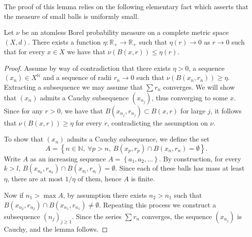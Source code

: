 \documentclass[AHL,Unicode,longabstracts]{cedram}
\newcommand{\nn}{\mathbb{N}}
\newcommand{\R}{{\mathbb R}}
\newcommand{\cv}{\rightarrow}
\newcommand{\set}[1]{\left\{#1\right\}}
\let\oldforall\forall
\renewcommand*{\forall}{\mathrel{\oldforall}}
\begin{document}
The proof of this lemma relies on the following elementary fact which asserts that the measure of small balls is uniformly small.

\begin{lemm}\label{lem:uniform}
Let $\nu$ be an atomless Borel probability measure on a complete metric space $(X,d)$. There exists a function $\eta : \R_+ \to \R_+$ such that $\eta(r)\to 0$ as $r\to 0$ such that for every $x\in X$ we have that $\nu(B(x,r))\leq \eta(r)$.
\end{lemm}

\goodbreak
\begin{proof}
Assume by way of contradiction that there exists $\eta>0$, a sequence $(x_n)\in X^\nn$ and a sequence of radii $r_n\cv 0$ such that $\nu(B(x_n, r_n))\geq \eta$. Extracting a subsequence we may assume that $\sum r_n$ converges. We will show that $(x_n)$ admits a Cauchy subsequence $(x_{n_j})$, thus converging to some $x$. Since for any $r>0$, we have that $B(x_{n_j}, r_{n_j}) \subset B(x, r)$ for large $j$, it follows that $\nu (B(x,r))\geq \eta$ for every $r$, contradicting the assumption on $\nu$.

To show that $(x_n)$ admits a Cauchy subsequence, we define the set
\[
A = \set{n\in \nn,\ \forall p>n, \ B(x_p, r_p) \cap B(x_n, r_n) = \emptyset}.
\]
Write $A$ as an increasing sequence $A = \set{a_1, a_2, \ldots}$. By construction, for every $k>l$, $B(x_{a_k}, r_{a_k}) \cap B(x_{a_l}, r_{a_l}) = \emptyset$. Since each of these balls has mass at least $ \eta$, there are at most $1/\eta$ of them, hence $A$ is finite.

Now if $n_1> \max A$, by assumption there exists $n_2>n_1$ such that $B(x_{n_2}, r_{n_2})\cap B(x_{n_1}, r_{n_1})\neq \emptyset$. Repeating this process we construct a subsequence $(n_j)_{j\geq 1}$. Since the series $\sum r_n$ converges, the sequence $(x_{n_j})$ is Cauchy, and the lemma follows.
\end{proof}
\end{document}

